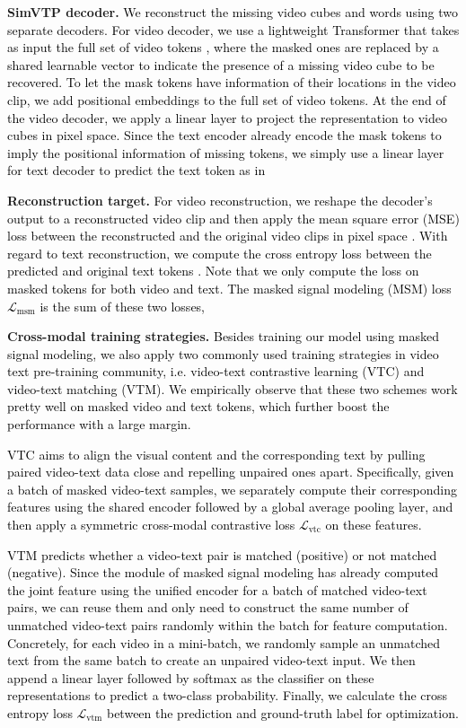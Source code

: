 \documentclass[10pt,twocolumn,letterpaper]{article}
\newcommand{\yty}[1]{\textcolor{black}{#1}}
\begin{document}
\noindent\textbf{SimVTP decoder.}
\yty{We reconstruct the missing video cubes and words using two separate decoders.  For video decoder, we use a lightweight Transformer that takes as input the full set of video tokens \cite{tong2022videomae}, where the masked ones are replaced by a shared learnable vector to indicate the presence of a missing video cube to be recovered.  To let the mask tokens have information of their locations in the video clip, we add positional embeddings to the full set of video tokens.  At the end of the video decoder, we apply a linear layer to project the representation to video cubes in pixel space. Since the text encoder already encode the mask tokens to imply the positional information of missing tokens, we simply use a linear layer for text decoder to predict the text token as in \cite{devlin2018bert}}



\noindent\textbf{Reconstruction target.}
\yty{For video reconstruction, we reshape the decoder's output to a reconstructed video clip and then apply the mean square error (MSE) loss between the reconstructed and the original video clips in pixel space \cite{tong2022videomae}. With regard to text reconstruction, we compute the cross entropy loss between the predicted and original text tokens \cite{devlin2018bert}. Note that we only compute the loss on masked tokens for both video and text. The masked signal modeling (MSM) loss $\mathcal{L}_{\mathrm{msm}}$ is the sum of these two losses, }


\noindent\textbf{Cross-modal training strategies.}
\yty{Besides training our model using masked signal modeling, we also apply two commonly used training strategies in video text pre-training community, i.e. video-text contrastive learning (VTC) and video-text matching (VTM). We empirically observe that these two schemes work pretty well on masked video and text tokens, which further boost the performance with a large margin.}

\yty{VTC aims to align the visual content and the corresponding text by pulling paired video-text data close and repelling unpaired ones apart. Specifically, given a batch of masked video-text samples, we separately compute their corresponding features using the shared encoder followed by a global average pooling layer, and then apply a symmetric cross-modal contrastive loss \cite{radford2021learning} $\mathcal{L}_{\mathrm{vtc}}$  on these features.}


\yty{VTM predicts whether a video-text pair is matched (positive) or not matched (negative).  Since the module of masked signal modeling has already computed the joint feature using the unified encoder for a batch of matched video-text pairs, we can reuse them and only need to construct the same number of unmatched video-text pairs randomly within the batch for feature computation. Concretely, for each video in a mini-batch, we randomly sample an unmatched text from the same batch to create an unpaired video-text input. We then append a linear layer followed by softmax as the classifier on these representations to predict a two-class probability. Finally, we calculate the cross entropy loss $\mathcal{L}_{\mathrm{vtm}}$ between the prediction and ground-truth label for optimization.}
\end{document}
